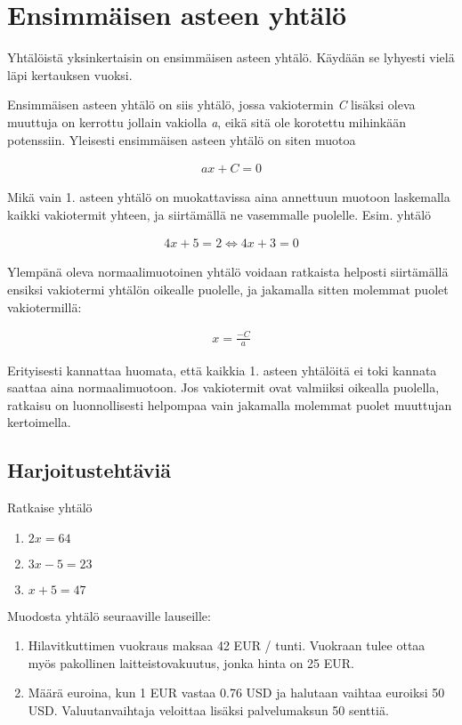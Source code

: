 \chapter{Ensimmäisen asteen yhtälö}

Yhtälöistä yksinkertaisin on ensimmäisen asteen yhtälö. Käydään se lyhyesti
vielä läpi kertauksen vuoksi.

Ensimmäisen asteen yhtälö on siis yhtälö, jossa vakiotermin \emph{C} lisäksi
oleva muuttuja on kerrottu jollain vakiolla \emph{a}, eikä sitä ole korotettu
mihinkään potenssiin. Yleisesti ensimmäisen asteen yhtälö on siten muotoa

\begin{align*}
    ax + C = 0
\end{align*}

Mikä vain 1. asteen yhtälö on muokattavissa aina
annettuun muotoon laskemalla kaikki vakiotermit yhteen,
ja siirtämällä ne vasemmalle puolelle. Esim. yhtälö

\begin{align*}
    4x + 5 = 2 \Leftrightarrow 4x + 3 = 0
\end{align*}

Ylempänä oleva normaalimuotoinen yhtälö voidaan ratkaista helposti siirtämällä
ensiksi vakiotermi yhtälön oikealle puolelle, ja jakamalla sitten molemmat puolet vakiotermillä:

\begin{align*}
    x = \frac{-C}{a}
\end{align*}

Erityisesti kannattaa huomata, että kaikkia 1. asteen yhtälöitä ei toki kannata
saattaa aina normaalimuotoon. Jos vakiotermit ovat valmiiksi oikealla puolella,
ratkaisu on luonnollisesti helpompaa vain jakamalla molemmat puolet muuttujan kertoimella.

\section{Harjoitustehtäviä}

\begin{tehtava}
  Ratkaise yhtälö
  \begin{enumerate}
    \item $2x = 64$
    \item $3x - 5 = 23$
    \item $x + 5 = 47$
  \end{enumerate}

  Muodosta yhtälö seuraaville lauseille:
  \begin{enumerate}
    \item Hilavitkuttimen vuokraus maksaa 42 EUR / tunti. Vuokraan tulee ottaa myös pakollinen laitteistovakuutus, jonka hinta on 25 EUR.
    \item Määrä euroina, kun 1 EUR vastaa 0.76 USD ja halutaan vaihtaa euroiksi 50 USD. Valuutanvaihtaja veloittaa lisäksi palvelumaksun 50 senttiä.
  \end{enumerate}

\end{tehtava}

